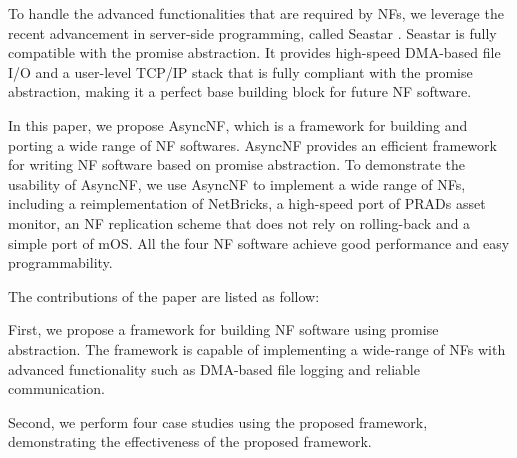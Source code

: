 To handle the advanced functionalities that are required by NFs, we leverage the
recent advancement in server-side programming, called Seastar \cite{seastar}. Seastar
is fully compatible with the promise abstraction. It provides high-speed
DMA-based file I/O and a user-level TCP/IP stack that is fully compliant with
the promise abstraction, making it a perfect base building block for future NF
software.

In this paper, we propose AsyncNF, which is a framework for building and porting
a wide range of NF softwares. AsyncNF provides an efficient framework for writing
NF software based on promise abstraction. To demonstrate the usability of
AsyncNF, we use AsyncNF to implement a wide range of NFs, including a
reimplementation of NetBricks, a high-speed port of PRADs asset monitor, an NF
replication scheme that does not rely on rolling-back and a simple port of
mOS. All the four NF software achieve good performance and easy
programmability.

The contributions of the paper are listed as follow:

First, we propose a framework for building NF software using promise
abstraction. The framework is capable of implementing a wide-range of NFs with
advanced functionality such as DMA-based file logging and reliable
communication.

Second, we perform four case studies using the proposed framework, demonstrating
the effectiveness of the proposed framework.
